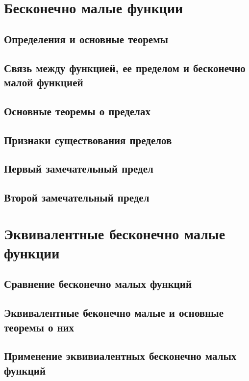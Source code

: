 \documentclass[14pt]{extreport}
\begin{document}
\chapter{Бесконечно малые функции}

\section{Определения и основные теоремы}

\section{Связь между функцией, ее пределом и бесконечно малой функцией}

\section{Основные теоремы о пределах}

\section{Признаки существования пределов}

\section{Первый замечательный предел}

\section{Второй замечательный предел}



\chapter{Эквивалентные бесконечно малые функции}

\section{Сравнение бесконечно малых функций}

\section{Эквивалентные беконечно малые и основные теоремы о них}

\section{Применение эквивиалентных бесконечно малых функций}
\end{document}
